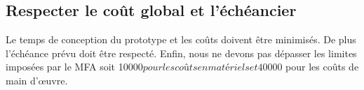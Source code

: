 

\subsection{Respecter le coût global et l’échéancier}
\label{s:beo_obj_cout_eche}

Le temps de conception du prototype et les coûts doivent être minimisés. De plus l’échéance prévu doit être respecté. Enfin, nous ne devons pas dépasser les limites imposées par le MFA soit 10000$ pour les coûts en matériels et 40000$ pour les coûts de main d’œuvre.
